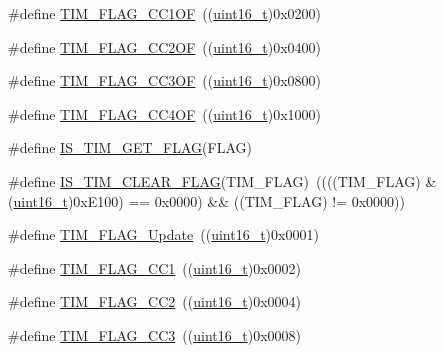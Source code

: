 \begin{DoxyCompactItemize}
\#define \hyperlink{group___t_i_m___flags_ga38dfb7d1ed00af77d70bc3be28500108}{T\+I\+M\+\_\+\+F\+L\+A\+G\+\_\+\+C\+C1\+OF}~((\hyperlink{_p_e___types_8h_a1f1825b69244eb3ad2c7165ddc99c956}{uint16\+\_\+t})0x0200)
\item 
\#define \hyperlink{group___t_i_m___flags_ga4df0c71d3e695c214d49802942e04590}{T\+I\+M\+\_\+\+F\+L\+A\+G\+\_\+\+C\+C2\+OF}~((\hyperlink{_p_e___types_8h_a1f1825b69244eb3ad2c7165ddc99c956}{uint16\+\_\+t})0x0400)
\item 
\#define \hyperlink{group___t_i_m___flags_gac81f24eaffdf83c2db9d2e6078a00919}{T\+I\+M\+\_\+\+F\+L\+A\+G\+\_\+\+C\+C3\+OF}~((\hyperlink{_p_e___types_8h_a1f1825b69244eb3ad2c7165ddc99c956}{uint16\+\_\+t})0x0800)
\item 
\#define \hyperlink{group___t_i_m___flags_gafc8b04654766d98ba2c6fed601895a20}{T\+I\+M\+\_\+\+F\+L\+A\+G\+\_\+\+C\+C4\+OF}~((\hyperlink{_p_e___types_8h_a1f1825b69244eb3ad2c7165ddc99c956}{uint16\+\_\+t})0x1000)
\item 
\#define \hyperlink{group___t_i_m___flags_ga6406de8131ae53ee29740c3e8627b098}{I\+S\+\_\+\+T\+I\+M\+\_\+\+G\+E\+T\+\_\+\+F\+L\+AG}(F\+L\+AG)
\item 
\#define \hyperlink{group___t_i_m___flags_gae60a1b5900de8354b2a4f017b2bd4f94}{I\+S\+\_\+\+T\+I\+M\+\_\+\+C\+L\+E\+A\+R\+\_\+\+F\+L\+AG}(T\+I\+M\+\_\+\+F\+L\+AG)~((((T\+I\+M\+\_\+\+F\+L\+AG) \& (\hyperlink{_p_e___types_8h_a1f1825b69244eb3ad2c7165ddc99c956}{uint16\+\_\+t})0x\+E100) == 0x0000) \&\& ((\+T\+I\+M\+\_\+\+F\+L\+A\+G) != 0x0000))
\item 
\#define \hyperlink{group___t_i_m___flags_ga97eba66f792c88e08131bd0d2a0e530d}{T\+I\+M\+\_\+\+F\+L\+A\+G\+\_\+\+Update}~((\hyperlink{_p_e___types_8h_a1f1825b69244eb3ad2c7165ddc99c956}{uint16\+\_\+t})0x0001)
\item 
\#define \hyperlink{group___t_i_m___flags_gaa7eb8be054b9bd217a9abb1c8687cc55}{T\+I\+M\+\_\+\+F\+L\+A\+G\+\_\+\+C\+C1}~((\hyperlink{_p_e___types_8h_a1f1825b69244eb3ad2c7165ddc99c956}{uint16\+\_\+t})0x0002)
\item 
\#define \hyperlink{group___t_i_m___flags_ga9cae242f1c51b31839ffc5bc007c82a7}{T\+I\+M\+\_\+\+F\+L\+A\+G\+\_\+\+C\+C2}~((\hyperlink{_p_e___types_8h_a1f1825b69244eb3ad2c7165ddc99c956}{uint16\+\_\+t})0x0004)
\item 
\#define \hyperlink{group___t_i_m___flags_ga052c380f922219659810e4fceb574a7c}{T\+I\+M\+\_\+\+F\+L\+A\+G\+\_\+\+C\+C3}~((\hyperlink{_p_e___types_8h_a1f1825b69244eb3ad2c7165ddc99c956}{uint16\+\_\+t})0x0008)
\item 

\end{DoxyCompactItemize}
